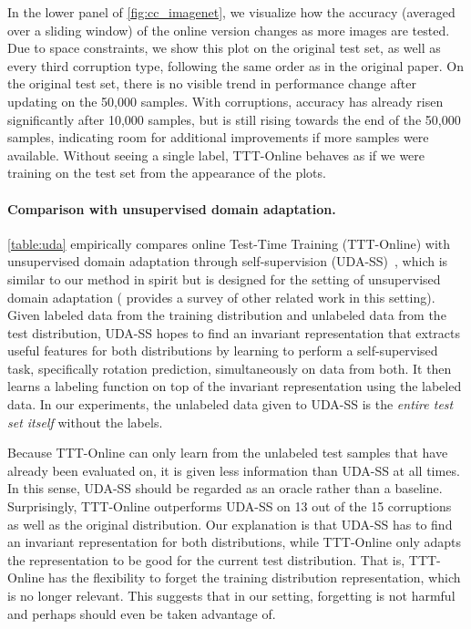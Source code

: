 In the lower panel of \autoref{fig:cc_imagenet}, we visualize how the accuracy (averaged over a sliding window) of the online version changes as more images are tested.
Due to space constraints, we show this plot on the original test set, as well as every third corruption type, following the same order as in the original paper. 
On the original test set, there is no visible trend in performance change after updating on the 50,000 samples.
With corruptions, accuracy has already risen significantly after 10,000 samples, but is still rising towards the end of the 50,000 samples, indicating room for additional improvements if more samples were available.
Without seeing a single label, TTT-Online behaves as if we were training on the test set from the appearance of the plots. 

\paragraph{Comparison with unsupervised domain adaptation.}
\autoref{table:uda} empirically compares online Test-Time Training (TTT-Online) with unsupervised domain adaptation through self-supervision (UDA-SS)~\citep{sun2019uda}, which is similar to our method in spirit but is designed for the setting of unsupervised domain adaptation ( provides a survey of other related work in this setting). 
Given labeled data from the training distribution and unlabeled data from the test distribution, UDA-SS hopes to find an invariant representation that extracts useful features for both distributions by learning to perform a self-supervised task, specifically rotation prediction, simultaneously on data from both. It then learns a labeling function on top of the invariant representation using the labeled data. In our experiments, the unlabeled data given to UDA-SS is the \emph{entire test set itself} without the labels.

Because TTT-Online can only learn from the unlabeled test samples that have already been evaluated on, it is given less information than UDA-SS at all times. In this sense, UDA-SS should be regarded as an oracle rather than a baseline.
Surprisingly, TTT-Online outperforms UDA-SS on 13 out of the 15 corruptions as well as the original distribution.
Our explanation is that UDA-SS has to find an invariant representation for both distributions, while TTT-Online only adapts the representation to be good for the current test distribution. That is, TTT-Online has the flexibility to  forget the training distribution representation, which is no longer relevant. This suggests that in our setting, forgetting is not harmful and perhaps should even be taken advantage of.

